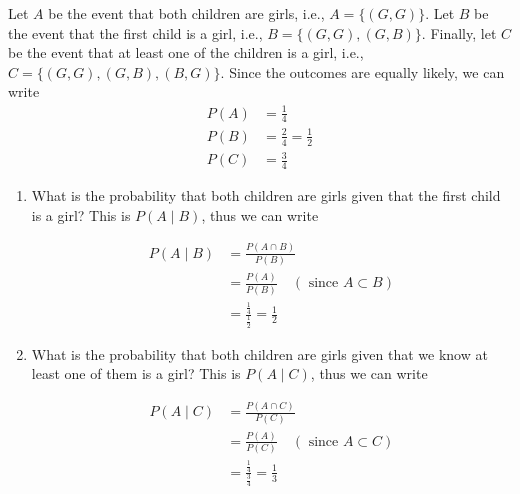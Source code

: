 \begin{solution}
    Let $A$ be the event that both children are girls, i.e., $A=\{(G, G)\}$. Let $B$ be the event that the first child is a girl, i.e., $B=\{(G, G),(G, B)\}$. Finally, let $C$ be the event that at least one of the children is a girl, i.e., $C=\{(G, G),(G, B),(B, G)\}$. Since the outcomes are equally likely, we can write
    \begin{align*}
    P(A) &= \frac{1}{4} \\
    P(B) &= \frac{2}{4} = \frac{1}{2} \\
    P(C) &= \frac{3}{4}
    \end{align*}


    \begin{enumerate}[label=(\alph*)]
         \item What is the probability that both children are girls given that the first child is a girl? This is $P(A \mid B)$, thus we can write

                    \begin{align*}
                    P(A \mid B) & =\frac{P(A \cap B)}{P(B)} \\
                    & =\frac{P(A)}{P(B)} \quad(\text { since } A \subset B) \\
                    & =\frac{\frac{1}{4}}{\frac{1}{2}}=\frac{1}{2}
                    \end{align*}
                
                \item What is the probability that both children are girls given that we know at least one of them is a girl? This is $P(A \mid C)$, thus we can write

                    \begin{align*}
                    P(A \mid C) & =\frac{P(A \cap C)}{P(C)} \\
                    & =\frac{P(A)}{P(C)} \quad(\text { since } A \subset C) \\
                    & =\frac{\frac{1}{4}}{\frac{3}{4}}=\frac{1}{3}
                    \end{align*}
        
    \end{enumerate}
\end{solution}

